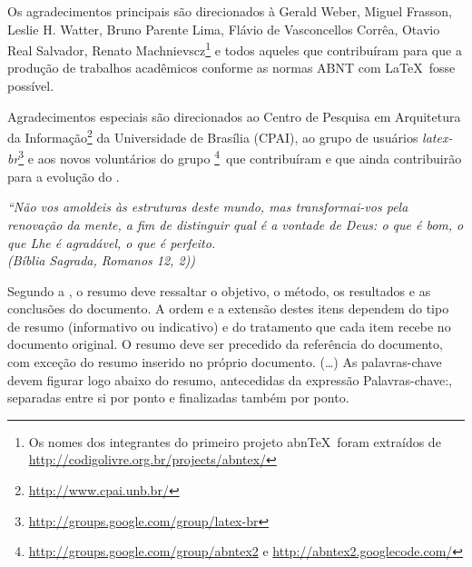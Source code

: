 \documentclass[
	12pt,				%
	openright,			%
	oneside,			%
	a4paper,			%
	dissertacao,			%
	]{ABNT-DC-UEL}
\begin{document}
\begin{agradecimentos}
Os agradecimentos principais são direcionados à Gerald Weber, Miguel Frasson,
Leslie H. Watter, Bruno Parente Lima, Flávio de Vasconcellos Corrêa, Otavio Real
Salvador, Renato Machnievscz\footnote{Os nomes dos integrantes do primeiro
projeto abn\TeX\ foram extraídos de
\url{http://codigolivre.org.br/projects/abntex/}} e todos aqueles que
contribuíram para que a produção de trabalhos acadêmicos conforme
as normas ABNT com \LaTeX\ fosse possível.

Agradecimentos especiais são direcionados ao Centro de Pesquisa em Arquitetura
da Informação\footnote{\url{http://www.cpai.unb.br/}} da Universidade de
Brasília (CPAI), ao grupo de usuários
\emph{latex-br}\footnote{\url{http://groups.google.com/group/latex-br}} e aos
novos voluntários do grupo
\emph{\abnTeX}\footnote{\url{http://groups.google.com/group/abntex2} e
\url{http://abntex2.googlecode.com/}}~que contribuíram e que ainda
contribuirão para a evolução do \abnTeX.

\end{agradecimentos}

\begin{epigrafe}
  \vspace*{\fill}
  \hspace{.4\textwidth}
  \begin{minipage}{.5\textwidth}   
    \begin{flushright}
	\textit{
    ``Não vos amoldeis às estruturas deste mundo,
      mas transformai-vos pela renovação da mente,
      a fim de distinguir qual é a vontade de Deus:
      o que é bom, o que Lhe é agradável, o que é perfeito.\\
      (Bíblia Sagrada, Romanos 12, 2))}
    \end{flushright}
  \end{minipage}
\end{epigrafe}


\begin{resumo}
 Segundo a , o resumo deve ressaltar o
 objetivo, o método, os resultados e as conclusões do documento. A ordem e a extensão
 destes itens dependem do tipo de resumo (informativo ou indicativo) e do
 tratamento que cada item recebe no documento original. O resumo deve ser
 precedido da referência do documento, com exceção do resumo inserido no
 próprio documento. (\ldots) As palavras-chave devem figurar logo abaixo do
 resumo, antecedidas da expressão Palavras-chave:, separadas entre si por
 ponto e finalizadas também por ponto.
\end{resumo}
\end{document}
